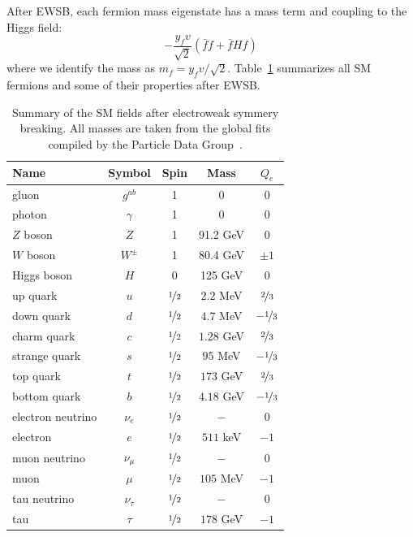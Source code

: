 After EWSB, each fermion mass eigenstate has a mass term and coupling to the Higgs field:
\begin{equation}
    -\frac{y_f v}{\sqrt{2}} \left( \bar ff + \bar fH f\right)
\end{equation}
where we identify the mass as $m_f = y_f v/\sqrt{2}$. 
Table~\ref{tab:theory:ewsb} summarizes all SM fermions and some of their properties after EWSB.

\begin{table}[]
\begin{center}
    \caption{Summary of the SM fields after electroweak symmery breaking.
             All masses are taken from the global fits compiled by the Particle Data Group~\cite{pdg}.}
    \label{tab:theory:ewsb}
    \begin{tabular}{l|c|c|c|c}
        Name & Symbol & Spin & Mass & $Q_e$  \\  \hline \hline
        gluon & $g^{ab}$ & 1 & 0 & 0 \\   
        photon & $\gamma $ & 1 & 0 & 0 \\   
        $Z$ boson & $Z$ & 1 & 91.2 GeV & 0 \\   
        $W$ boson & $W^{\pm}$ & 1 & 80.4 GeV & $\pm 1$ \\   \hline 
        Higgs boson & $H$ & 0 & 125 GeV & $0$ \\   \hline 
        up quark & $u$ & $\nicefrac{1}{2}$ & $2.2$ MeV & $\nicefrac{2}{3}$    \\   
        down quark & $d$  & $\nicefrac{1}{2}$ & $4.7$ MeV  & $-\nicefrac{1}{3}$  \\   
        charm quark & $c$  & $\nicefrac{1}{2}$ & $1.28$ GeV  & $\nicefrac{2}{3}$  \\   
        strange quark & $s$  & $\nicefrac{1}{2}$ & $95$ MeV  & $-\nicefrac{1}{3}$  \\   
        top quark & $t$  & $\nicefrac{1}{2}$ & $173$ GeV  & $\nicefrac{2}{3}$  \\  \hline
        bottom quark & $b$  & $\nicefrac{1}{2}$ & $4.18$ GeV  & $-\nicefrac{1}{3}$  \\   
        electron neutrino  & $\nu_e$  & $\nicefrac{1}{2}$ & $-$  & $0$  \\   
        electron  & $e$  & $\nicefrac{1}{2}$ & $511$ keV  & $-1$  \\   
        muon neutrino  & $\nu_\mu$  & $\nicefrac{1}{2}$ & $-$  & $0$  \\   
        muon  & $\mu$  & $\nicefrac{1}{2}$ & $105$ MeV  & $-1$  \\   
        tau neutrino  & $\nu_\tau$  & $\nicefrac{1}{2}$ & $-$  & $0$  \\ 
        tau  & $\tau$  & $\nicefrac{1}{2}$ & $178$ GeV  & $-1$  \\   
    \end{tabular}
\end{center}
\end{table}

